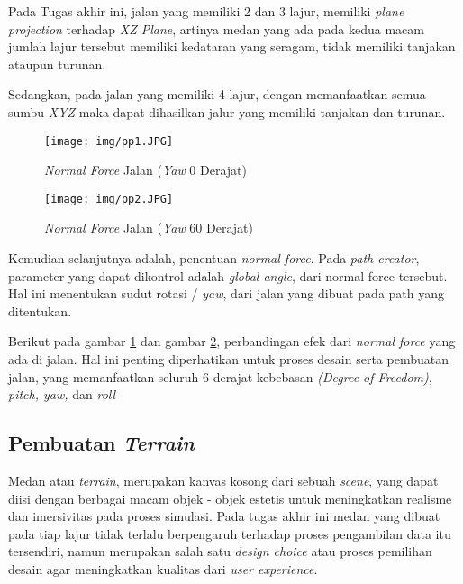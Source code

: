         \par Pada Tugas akhir ini, jalan yang memiliki 2 dan 3 lajur, memiliki \textit{plane projection} terhadap \textit{XZ Plane}, artinya medan yang ada pada kedua macam jumlah lajur tersebut memiliki kedataran yang seragam, tidak memiliki tanjakan ataupun turunan. 
        
        \par Sedangkan, pada jalan yang memiliki 4 lajur, dengan memanfaatkan semua sumbu \textit{XYZ} maka dapat dihasilkan jalur yang memiliki tanjakan dan turunan.
        
        \begin{figure} [!htb]
	        \captionsetup{justification=centering}
	        \texttt{[image: img/pp1.JPG]}
	        \caption{\textit{Normal Force} Jalan (\textit{Yaw} 0 Derajat)}
	        \label{fig: 3_13}
        \end{figure}
        
        \begin{figure} [!htb]
	        \captionsetup{justification=centering}
	        \texttt{[image: img/pp2.JPG]}
	        \caption{\textit{Normal Force} Jalan (\textit{Yaw} 60 Derajat)}
	        \label{fig: 3_14}
        \end{figure}
        
        Kemudian selanjutnya adalah, penentuan \textit{normal force}. Pada \textit{path creator}, parameter yang dapat dikontrol adalah \textit{global angle}, dari normal force tersebut. Hal ini menentukan sudut rotasi / \textit{yaw}, dari jalan yang dibuat pada path yang ditentukan.
        \par Berikut pada gambar \ref{fig: 3_13} dan gambar \ref{fig: 3_14}, perbandingan efek dari \textit{normal force} yang ada di jalan. Hal ini penting diperhatikan untuk proses desain serta pembuatan jalan, yang memanfaatkan seluruh 6 derajat kebebasan \textit{(Degree of Freedom)}, \textit{pitch, yaw,} dan \textit{roll}
	
	\subsection{Pembuatan \textit{Terrain}}
	\vspace{1ex}
	
	Medan atau \textit{terrain}, merupakan kanvas kosong dari sebuah \textit{scene}, yang dapat diisi dengan berbagai macam objek - objek estetis untuk meningkatkan realisme dan imersivitas pada proses simulasi. Pada tugas akhir ini medan yang dibuat pada tiap lajur tidak terlalu berpengaruh terhadap proses pengambilan data itu tersendiri, namun merupakan salah satu \textit{design choice} atau proses pemilihan desain agar meningkatkan kualitas dari \textit{user experience}.
	
